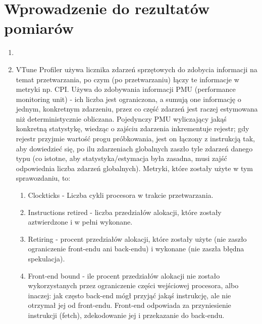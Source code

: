 \documentclass[12pt]{article}
\begin{document}
\section {Wprowadzenie do rezultatów pomiarów}
\begin{enumerate}
	\item 
	\item VTune Profiler używa licznika zdarzeń sprzętowych do zdobycia informacji na temat przetwarzania, po czym (po przetwarzaniu) łączy te informacje w metryki np. CPI. Używa do zdobywania informacji PMU (performance monitoring unit) - ich liczba jest ograniczona, a sumują one informację o jednym, konkretnym zdarzeniu, przez co część zdarzeń jest raczej estymowana niż deterministycznie obliczana. Pojedynczy PMU wyliczający jakąś konkretną statystykę, wiedząc o zajściu zdarzenia inkrementuje rejestr; gdy rejestr przyjmie wartość progu próbkowania, jest on łączony z instrukcją tak, aby dowiedzieć się, po ilu zdarzeniach globalnych zaszło tyle zdarzeń danego typu (co istotne, aby statystyka/estymacja była zasadna, musi zajść odpowiednia liczba zdarzeń globalnych). Metryki, które zostały użyte w tym sprawozdaniu, to: 
	
	\begin{enumerate}
		\item Clockticks - Liczba cykli procesora w trakcie przetwarzania.
		\item Instructions retired - liczba przedziałów alokacji, które zostały aztwierdzone i w pełni wykonane.
		\item Retiring - procent przedziałów alokacji, które zostały użyte (nie zaszło ograniczenie front-endu ani back-endu) i wykonane (nie zaszła błędna spekulacja).
		
		\item Front-end bound - ile procent przedziałów alokacji nie zostało wykorzystanych przez ograniczenie części wejściowej procesora, albo inaczej: jak często back-end mógł przyjąć jakąś instrukcję, ale nie otrzymał jej od front-endu. Front-end odpowiada za przyniesienie instrukcji (fetch), zdekodowanie jej i przekazanie do back-endu.
		

\end{enumerate}
\end{enumerate}
\end{document}
